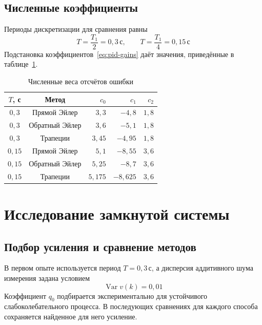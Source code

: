 \subsection{Численные коэффициенты}

Периоды дискретизации для сравнения равны
\begin{equation}
  T=\frac{T_1}{2}=0{,}3\,\text{с},
  \qquad T=\frac{T_1}{4}=0{,}15\,\text{с}
  \label{eq:sample-periods}
\end{equation}
Подстановка коэффициентов~\eqref{eq:pid-gains} даёт значения,
приведённые в таблице~\ref{tab:pid-numeric}.

\begin{table}[!htbp]
  \centering
  \caption{Численные веса отсчётов ошибки}
  \label{tab:pid-numeric}
  \begin{tabular}{c c r r r}
    \toprule
    $T$, с & Метод & $c_0$ & $c_1$ & $c_2$\\
    \midrule
    $0{,}3$ & Прямой Эйлер & $3{,}3$ & $-4{,}8$ & $1{,}8$\\
    $0{,}3$ & Обратный Эйлер & $3{,}6$ & $-5{,}1$ & $1{,}8$\\
    $0{,}3$ & Трапеции & $3{,}45$ & $-4{,}95$ & $1{,}8$\\
    \midrule
    $0{,}15$ & Прямой Эйлер & $5{,}1$ & $-8{,}55$ & $3{,}6$\\
    $0{,}15$ & Обратный Эйлер & $5{,}25$ & $-8{,}7$ & $3{,}6$\\
    $0{,}15$ & Трапеции & $5{,}175$ & $-8{,}625$ & $3{,}6$\\
    \bottomrule
  \end{tabular}
\end{table}

\section{Исследование замкнутой системы}

\subsection{Подбор усиления и сравнение методов}

В первом опыте используется период $T=0{,}3\,\text{с}$,
а дисперсия аддитивного шума измерения задана условием
\begin{equation}
  \operatorname{Var}v(k)=0{,}01
  \label{eq:pid-measurement-variance}
\end{equation}
Коэффициент $q_0$ подбирается экспериментально для устойчивого
слабоколебательного процесса. В последующих сравнениях для каждого
способа сохраняется найденное для него усиление.

